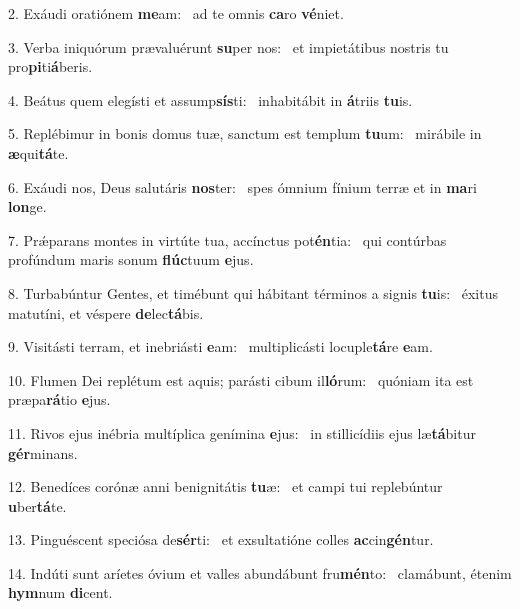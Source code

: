 2. Exáudi oratiónem \textbf{me}am: \ast\  ad te omnis \textbf{ca}ro \textbf{vé}niet.\

3. Verba iniquórum prævaluérunt \textbf{su}per nos: \ast\  et impietátibus nostris tu pro\textbf{pi}ti\textbf{á}beris.\

4. Beátus quem elegísti et assump\textbf{sís}ti: \ast\  inhabitábit in \textbf{á}triis \textbf{tu}is.\

5. Replébimur in bonis domus tuæ, sanctum est templum \textbf{tu}um: \ast\  mirábile in \textbf{æ}qui\textbf{tá}te.\

6. Exáudi nos, Deus salutáris \textbf{nos}ter: \ast\  spes ómnium fínium terræ et in \textbf{ma}ri \textbf{lon}ge.\

7. Prǽparans montes in virtúte tua, accínctus pot\textbf{én}tia: \ast\  qui contúrbas profúndum maris sonum \textbf{flúc}tuum \textbf{e}jus.\

8. Turbabúntur Gentes, et timébunt qui hábitant términos a signis \textbf{tu}is: \ast\  éxitus matutíni, et véspere \textbf{de}lec\textbf{tá}bis.\

9. Visitásti terram, et inebriásti \textbf{e}am: \ast\  multiplicásti locuple\textbf{tá}re \textbf{e}am.\

10. Flumen Dei replétum est aquis; parásti cibum il\textbf{ló}rum: \ast\  quóniam ita est præpa\textbf{rá}tio \textbf{e}jus.\

11. Rivos ejus inébria multíplica genímina \textbf{e}jus: \ast\  in stillicídiis ejus læ\textbf{tá}bitur \textbf{gér}minans.\

12. Benedíces corónæ anni benignitátis \textbf{tu}æ: \ast\  et campi tui replebúntur \textbf{u}ber\textbf{tá}te.\

13. Pinguéscent speciósa de\textbf{sér}ti: \ast\  et exsultatióne colles \textbf{ac}cin\textbf{gén}tur.\

14. Indúti sunt aríetes óvium et valles abundábunt fru\textbf{mén}to: \ast\  clamábunt, étenim \textbf{hym}num \textbf{di}cent.\

